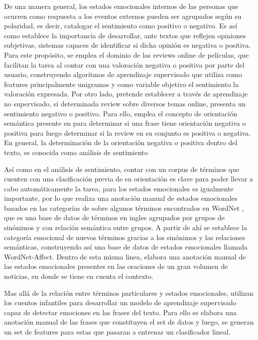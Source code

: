 De una manera general, los estados emocionales internos de las personas que ocurren como respuesta a los eventos externos pueden ser agrupados según su polaridad, es decir, catalogar el sentimiento como positivo o negativo. Es así como  \cite{pang2002thumbs}  establece la importancia de desarrollar, ante textos que reflejen opiniones subjetivas, sistemas capaces de identificar si dicha opinión es negativa o positiva. Para este propósito, se emplea el dominio de las reviews online de películas, que facilitan la tarea al contar con una valoración negativa o positiva por parte del usuario, construyendo algoritmos de aprendizaje supervisado que utiliza como features principalmente unigramas y como variable objetivo el sentimiento la valoración expresada. Por otro lado,  \cite{turney2002thumbs} pretende establecer a través de aprendizaje no supervisado, si determinada review sobre diversos temas online, presenta un sentimiento negativo o positivo. Para ello, emplea el concepto de orientación semántica presente en \cite{hatzivassiloglou1997predicting} para determinar si una frase tiene orientación negativa o positiva para luego determinar si la review en su conjunto es positiva o negativa. En general, la determinación de la orientación negativa o positiva dentro del texto, es conocida como análisis de sentimiento

Así como en el análisis de sentimiento, contar con un corpus de términos que cuenten con una clasificación previa de su orientación es clave para poder llevar a cabo automáticamente la tarea, para los estados emocionales  es igualmente importante, por lo que \cite{strapparava2004wordnet} realiza una anotación manual de estados emocionales basados en las categorías de \cite{ortony1987referential} sobre algunos términos encontrados en WordNet \cite{miller1995wordnet}, que es una base de datos de términos en ingles agrupados por grupos de sinónimos y con relación semántica entre grupos. A partir de ahí se establece la categoría emocional de nuevos términos gracias a los sinónimos y las relaciones semánticas, construyendo así una base de datos de estados emocionales llamada WordNet-Affect. Dentro de esta misma linea, \cite{wiebe2005annotating}  elabora una anotación manual de las estados emocionales presentes en las oraciones de un gran volumen de noticias, en donde se tiene en cuenta el contexto. 

Mas allá de la relación entre términos particulares y estados emocionales, \cite{alm2005emotions} utilizan los cuentos infantiles para desarrollar un modelo de aprendizaje supervisado capaz de detectar emociones en las frases del texto. Para ello se elabora una anotación manual de las frases que constituyen el set de datos y luego, se generan un set de features para estas que pasaran a entrenar un clasificador lineal.



